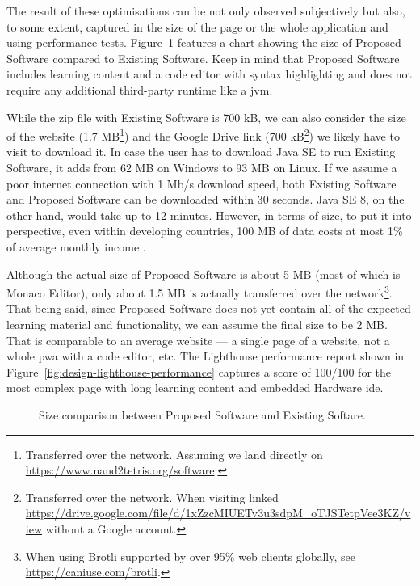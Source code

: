 The result of these optimisations can be not only observed subjectively but also, to some extent, captured in the size of the page or the whole application and using performance tests.
Figure~\ref{fig:design-size-comparison} features a chart showing the size of Proposed Software compared to Existing Software.
Keep in mind that Proposed Software includes learning content and a code editor with syntax highlighting and does not require any additional third-party runtime like a \gls{jvm}.

While the zip file with Existing Software is 700 kB, we can also consider the size of the website (1.7 MB\footnote{Transferred over the network. Assuming we land directly on \url{https://www.nand2tetris.org/software}.}) and the Google Drive link (700 kB\footnote{Transferred over the network. When visiting linked \url{https://drive.google.com/file/d/1xZzcMIUETv3u3sdpM_oTJSTetpVee3KZ/view} without a Google account.}) we likely have to visit to download it.
In case the user has to download Java SE to run Existing Software, it adds from 62 MB on Windows to 93 MB on Linux.
If we assume a poor internet connection with 1 Mb/s download speed, both Existing Software and Proposed Software can be downloaded within 30 seconds.
Java SE 8, on the other hand, would take up to 12 minutes.
However, in terms of size, to put it into perspective, even within developing countries, 100 MB of data costs at most 1\% of average monthly income \parencite{Rodriguez_2022}.

Although the actual size of Proposed Software is about 5 MB (most of which is Monaco Editor), only about 1.5 MB is actually transferred over the network\footnote{When using Brotli supported by over 95\% web clients globally, see \url{https://caniuse.com/brotli}.}.
That being said, since Proposed Software does not yet contain all of the expected learning material and functionality, we can assume the final size to be 2 MB.
That is comparable to an average website \parencite{Indigo_2022} --- a single page of a website, not a whole \gls{pwa} with a code editor, etc.
The Lighthouse performance report shown in Figure~\ref{fig:design-lighthouse-performance} captures a score of 100/100 for the most complex page with long learning content and embedded Hardware \gls{ide}.

\begin{figure}[H]
    \centering
    
    \caption{Size comparison between Proposed Software and Existing Softare.}
    \label{fig:design-size-comparison}
\end{figure}

